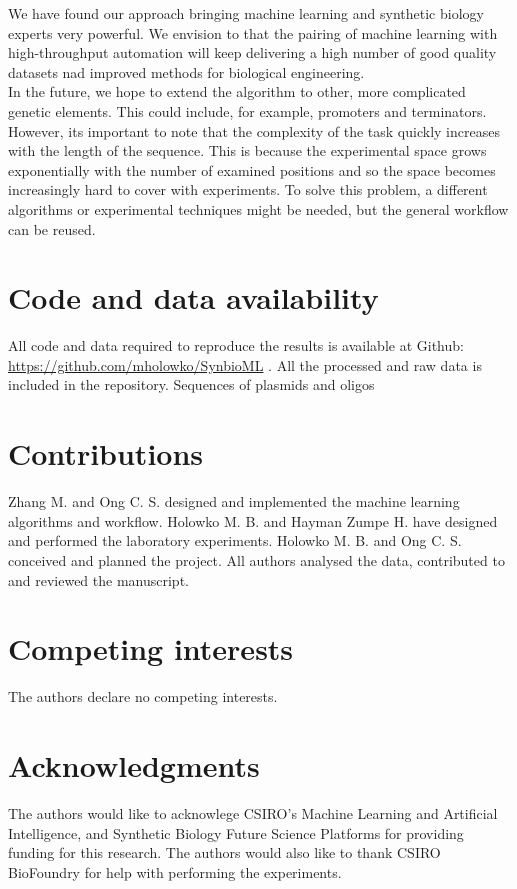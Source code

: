 \documentclass{article}
\begin{document}
We have found our approach bringing machine learning and synthetic biology experts very powerful.
We envision to that the pairing of machine learning with high-throughput automation will keep delivering a high number of good quality datasets nad improved methods for biological engineering.\\

In the future, we hope to extend the algorithm to other, more complicated genetic elements.
This could include, for example, promoters and terminators.
However, its important to note that the complexity of the task quickly increases with the length of the sequence.
This is because the experimental space grows exponentially with the number of examined positions and so the space becomes increasingly hard to cover with experiments.
To solve this problem, a different algorithms or experimental techniques might be needed, but the general workflow can be reused.\\



\section*{Code and data availability}

All code and data required to reproduce the results is available at Github: \url{https://github.com/mholowko/SynbioML} .
All the processed and raw data is included in the repository.
Sequences of plasmids and oligos 

\section*{Contributions}
Zhang M. and Ong C. S. designed and implemented the machine learning algorithms and workflow. Holowko M. B. and Hayman Zumpe H. have designed and performed the laboratory experiments. Holowko M. B. and Ong C. S. conceived and planned the project. All authors analysed the data, contributed to and reviewed the manuscript.

\section*{Competing interests}
The authors declare no competing interests.

\section*{Acknowledgments}
The authors would like to acknowlege CSIRO's Machine Learning and Artificial Intelligence, and Synthetic Biology Future Science Platforms for providing funding for this research. The authors would also like to thank CSIRO BioFoundry for help with performing the experiments.


\newpage

\printbibliography

\clearpage

\appendix

\end{document}
